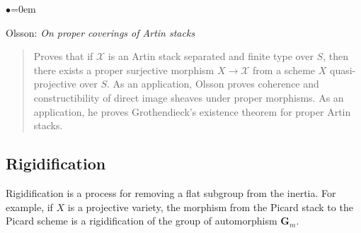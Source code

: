 \begin{list}{$\bullet$}{\leftmargin=0em}
\item Olsson: \emph{On proper coverings of Artin stacks} \cite{olsson_proper}
\begin{quote}
Proves that if $\mathcal{X}$ is an Artin stack separated
and finite type over $S$, then
there exists a proper surjective morphism $X \to \mathcal{X}$ from a scheme $X$
quasi-projective over $S$. As an application, Olsson proves coherence and
constructibility of direct image sheaves under proper morphisms. As an
application, he proves Grothendieck's existence theorem for proper
Artin stacks.
\end{quote}
\end{list}


\subsection{Rigidification}
\label{subsection-rigidification}

\noindent
Rigidification is a process for removing a flat subgroup from the inertia.
For example, if $X$ is a projective variety, the morphism from the Picard
stack to the Picard scheme is a rigidification of the group of automorphism
$\mathbf{G}_m$.

\smallskip

